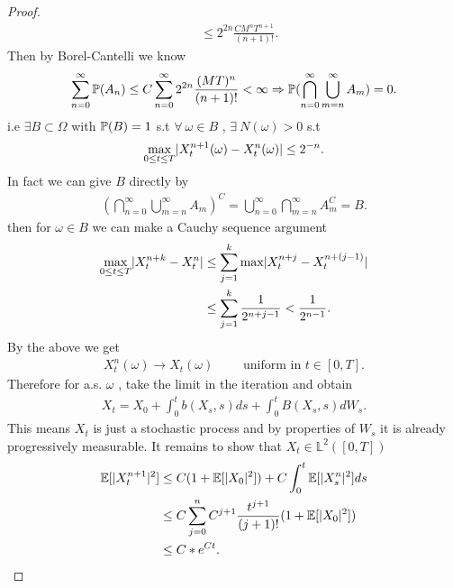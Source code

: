 \begin{proof}
\begin{align*}
                                                                      &\le 2^{2n} \frac{CM^{n}T^{n+1}  }{(n+1)!} 
  .\end{align*}
  Then by Borel-Cantelli we know
  \begin{align*}
    \sum_{n=0}^{\infty} \P(A_n) \le  C \sum_{n=0}^{\infty}2^{2n} \frac{(MT)^{n} }{(n+1)!}    <\infty \implies \P(\bigcap_{n=0}^{\infty} \bigcup_{m=n}^{\infty} A_m ) = 0
   .\end{align*}
   i.e $\exists  B \subset  \Omega  $ with $\P(B) = 1$ s.t $\forall \ \omega  \in  B$ , $\exists \ N(\omega ) > 0 $ s.t
   \begin{align*}
     \max_{0\le t\le T} \abs{X_t^{n+1}(\omega ) - X_t^{n}(\omega )} \le  2^{-n} 
   .\end{align*}
   In fact we can give $B$ directly by 
   \begin{align*}
     \left( \bigcap_{n=0}^{\infty} \bigcup_{m=n}^{\infty} A_m   \right)^{C} = \bigcup_{n=0}^{\infty} \bigcap_{m=n}^{\infty} A_m^{C} = B     
   .\end{align*}
   then for $\omega  \in  B$  we can make a Cauchy sequence argument
   \begin{align*}
     \max_{0\le t\le T} \abs{X_t^{n+k} - X^{n}_t } &\le  \sum_{j=1}^{k} \max \abs{X_t^{n+j} - X^{n+(j-1)}_t } \\
                                                   &\le \sum_{j=1}^{k} \frac{1}{2^{n+j-1} } < \frac{1}{2^{n-1} } 
   .\end{align*}
   By the above we get 
   \begin{align*}
     X_t^{n}(\omega ) \to X_t(\omega ) \qquad \text{ uniform in } t\in [0,T]
   .\end{align*}
   Therefore for a.s. $\omega $ , take the limit in the iteration  and obtain 
   \begin{align*}
    X_t = X_{0} + \int_0^{t} b(X_s,s) ds + \int_0^{t} B(X_s,s) dW_s  
   .\end{align*}
   This means $X_t$ is just a stochastic process and by properties of $W_s$ it is already progressively measurable.
   It remains to show that $X_t \in  \mathbb{L}^2([0,T])$
   \begin{align*}
     \E[\abs{X_t^{n+1}}^2] &\le  C(1+\E[\abs{X_0}^2]) + C \int_0^{t} \E[\abs{X_s^{n} }^2] ds \\
                           &\le  C \sum_{j=0}^{n} C^{j+1} \frac{t^{j+1}}{(j+1)!} (1+\E[\abs{X_0}^2]) \\
                           &\le  C* e^{Ct} 
   .\end{align*}

\end{proof}
